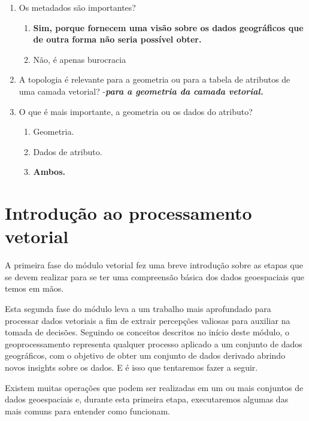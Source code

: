 \documentclass[
]{krantz}
\providecommand{\tightlist}{%
  \setlength{\itemsep}{0pt}\setlength{\parskip}{0pt}}
\begin{document}
\begin{enumerate}
\def\labelenumi{\arabic{enumi}.}
\tightlist
\item
  Os metadados são importantes?

  \begin{enumerate}
  \def\labelenumii{\alph{enumii}.}
  \tightlist
  \item
    \textbf{Sim, porque fornecem uma visão sobre os dados geográficos que de outra forma não seria possível obter.}
  \item
    Não, é apenas burocracia
  \end{enumerate}
\item
  A topologia é relevante para a geometria ou para a tabela de atributos de uma camada vetorial? -\textbf{\emph{para a geometria da camada vetorial.}}
\item
  O que é mais importante, a geometria ou os dados do atributo?

  \begin{enumerate}
  \def\labelenumii{\alph{enumii}.}
  \tightlist
  \item
    Geometria.
  \item
    Dados de atributo.
  \item
    \textbf{Ambos.}
  \end{enumerate}
\end{enumerate}

\hypertarget{introduuxe7uxe3o-ao-processamento-vetorial}{%
\section{Introdução ao processamento vetorial}\label{introduuxe7uxe3o-ao-processamento-vetorial}}

A primeira fase do módulo vetorial fez uma breve introdução sobre as etapas que se devem realizar para se ter uma compreensão básica dos dados geoespaciais que temos em mãos.

Esta segunda fase do módulo leva a um trabalho mais aprofundado para processar dados vetoriais a fim de extrair percepções valiosas para auxiliar na tomada de decisões. Seguindo os conceitos descritos no início deste módulo, o geoprocessamento representa qualquer processo aplicado a um conjunto de dados geográficos, com o objetivo de obter um conjunto de dados derivado abrindo novos insights sobre os dados. E é isso que tentaremos fazer a seguir.

Existem muitas operações que podem ser realizadas em um ou mais conjuntos de dados geoespaciais e, durante esta primeira etapa, executaremos algumas das mais comuns para entender como funcionam.
\end{document}
